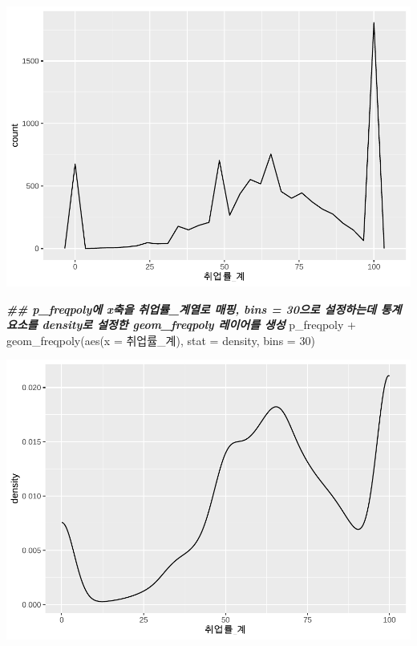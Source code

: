 \documentclass[
]{article}
\newenvironment{Shaded}{\begin{snugshade}}{\end{snugshade}}
\newcommand{\AttributeTok}[1]{\textcolor[rgb]{0.77,0.63,0.00}{#1}}
\newcommand{\DecValTok}[1]{\textcolor[rgb]{0.00,0.00,0.81}{#1}}
\newcommand{\DocumentationTok}[1]{\textcolor[rgb]{0.56,0.35,0.01}{\textbf{\textit{#1}}}}
\newcommand{\FunctionTok}[1]{\textcolor[rgb]{0.00,0.00,0.00}{#1}}
\newcommand{\NormalTok}[1]{#1}
\newcommand{\SpecialCharTok}[1]{\textcolor[rgb]{0.00,0.00,0.00}{#1}}
\newcommand{\StringTok}[1]{\textcolor[rgb]{0.31,0.60,0.02}{#1}}
\begin{document}
\includegraphics{chap3_files/figure-latex/unnamed-chunk-22-1.pdf}

\begin{Shaded}
\begin{Highlighting}[]
\DocumentationTok{\#\# p\_freqpoly에 x축을 \textquotesingle{}취업률\_계\textquotesingle{}열로 매핑, bins = 30으로 설정하는데 통계요소를 \textquotesingle{}density\textquotesingle{}로 설정한 geom\_freqpoly 레이어를 생성}
\NormalTok{p\_freqpoly }\SpecialCharTok{+}
  \FunctionTok{geom\_freqpoly}\NormalTok{(}\FunctionTok{aes}\NormalTok{(}\AttributeTok{x =}\NormalTok{ 취업률\_계), }\AttributeTok{stat =} \StringTok{\textquotesingle{}density\textquotesingle{}}\NormalTok{, }\AttributeTok{bins =} \DecValTok{30}\NormalTok{)}
\end{Highlighting}
\end{Shaded}

\includegraphics{chap3_files/figure-latex/unnamed-chunk-22-2.pdf}
\end{document}
